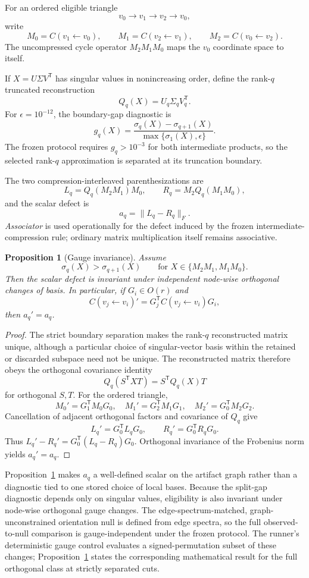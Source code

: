 \documentclass[11pt]{article}
\newcommand{\Q}{Q}
\newtheorem{proposition}{Proposition}
\begin{document}
For an ordered eligible triangle
\[
v_0\longrightarrow v_1\longrightarrow v_2\longrightarrow v_0,
\]
write
\[
M_0=C(v_1\leftarrow v_0),\qquad
M_1=C(v_2\leftarrow v_1),\qquad
M_2=C(v_0\leftarrow v_2).
\]
The uncompressed cycle operator \(M_2M_1M_0\) maps the \(v_0\) coordinate
space to itself.

If \(X=U\Sigma V^{\mathsf T}\) has singular values in nonincreasing order,
define the rank-\(q\) truncated reconstruction
\[
\Q_q(X)=U_q\Sigma_qV_q^{\mathsf T}.
\]
For \(\epsilon=10^{-12}\), the boundary-gap diagnostic is
\[
g_q(X)=
\frac{\sigma_q(X)-\sigma_{q+1}(X)}
{\max\{\sigma_1(X),\epsilon\}}.
\]
The frozen protocol requires \(g_q>10^{-3}\) for both intermediate products,
so the selected rank-\(q\) approximation is separated at its truncation
boundary.

The two compression-interleaved parenthesizations are
\[
L_q=\Q_q(M_2M_1)M_0,
\qquad
R_q=M_2\Q_q(M_1M_0),
\]
and the scalar defect is
\[
a_q=\lVert L_q-R_q\rVert_F.
\]
\emph{Associator} is used operationally for the defect induced by the frozen
intermediate-compression rule; ordinary matrix multiplication itself remains
associative.

\begin{proposition}[Gauge invariance]
\label{prop:gauge-invariance}
Assume
\[
\sigma_q(X)>\sigma_{q+1}(X)
\qquad\text{for }X\in\{M_2M_1,M_1M_0\}.
\]
Then the scalar defect is invariant under independent node-wise orthogonal
changes of basis. In particular, if \(G_i\in O(r)\) and
\[
C(v_j\leftarrow v_i)'=G_j^{\mathsf T}
C(v_j\leftarrow v_i)G_i,
\]
then \(a_q'=a_q\).
\end{proposition}

\begin{proof}
The strict boundary separation makes the rank-\(q\) reconstructed matrix
unique, although a particular choice of singular-vector basis within the
retained or discarded subspace need not be unique. The reconstructed matrix
therefore obeys the orthogonal covariance identity
\[
\Q_q(S^{\mathsf T}XT)=S^{\mathsf T}\Q_q(X)T
\]
for orthogonal \(S,T\). For the ordered triangle,
\[
M_0'=G_1^{\mathsf T}M_0G_0,\quad
M_1'=G_2^{\mathsf T}M_1G_1,\quad
M_2'=G_0^{\mathsf T}M_2G_2.
\]
Cancellation of adjacent orthogonal factors and covariance of \(\Q_q\) give
\[
L_q'=G_0^{\mathsf T}L_qG_0,
\qquad
R_q'=G_0^{\mathsf T}R_qG_0.
\]
Thus \(L_q'-R_q'=G_0^{\mathsf T}(L_q-R_q)G_0\). Orthogonal invariance of the
Frobenius norm yields \(a_q'=a_q\).
\end{proof}

Proposition~\ref{prop:gauge-invariance} makes \(a_q\) a well-defined scalar on
the artifact graph rather than a diagnostic tied to one stored choice of local
bases. Because the split-gap diagnostic depends only on singular values,
eligibility is also invariant under node-wise orthogonal gauge changes. The
edge-spectrum-matched, graph-unconstrained orientation null is defined from
edge spectra, so the full observed-to-null comparison is gauge-independent
under the frozen protocol. The runner's deterministic gauge control evaluates
a signed-permutation subset of these changes; Proposition~\ref{prop:gauge-invariance}
states the corresponding mathematical result for the full orthogonal class at
strictly separated cuts.
\end{document}
